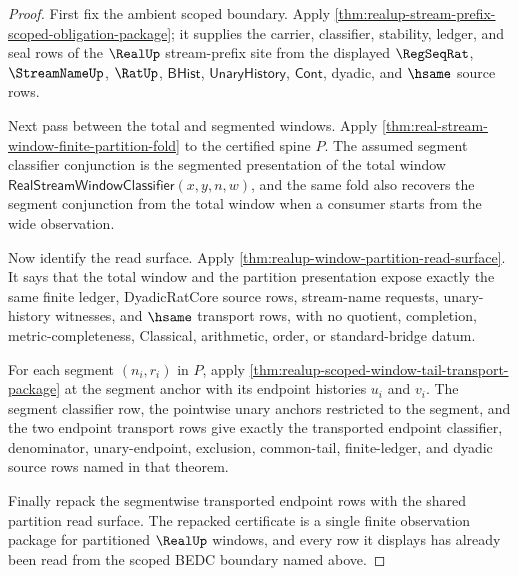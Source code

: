 \begin{proof}
First fix the ambient scoped boundary. Apply
\autoref{thm:realup-stream-prefix-scoped-obligation-package}; it supplies the
carrier, classifier, stability, ledger, and seal rows of the $\RealUp$
stream-prefix site from the displayed $\RegSeqRat$, $\StreamNameUp$, $\RatUp$,
$\mathsf{BHist}$, $\mathsf{UnaryHistory}$, $\mathsf{Cont}$, dyadic, and $\hsame$
source rows.

Next pass between the total and segmented windows. Apply
\autoref{thm:real-stream-window-finite-partition-fold} to the certified spine
$P$. The assumed segment classifier conjunction is the segmented presentation of
the total window $\mathsf{RealStreamWindowClassifier}(x,y,n,w)$, and the same
fold also recovers the segment conjunction from the total window when a consumer
starts from the wide observation.

Now identify the read surface. Apply
\autoref{thm:realup-window-partition-read-surface}. It says that the total
window and the partition presentation expose exactly the same finite ledger,
DyadicRatCore source rows, stream-name requests, unary-history witnesses, and
$\hsame$ transport rows, with no quotient, completion, metric-completeness,
Classical, arithmetic, order, or standard-bridge datum.

For each segment $(n_i,r_i)$ in $P$, apply
\autoref{thm:realup-scoped-window-tail-transport-package} at the segment anchor
with its endpoint histories $u_i$ and $v_i$. The segment classifier row, the
pointwise unary anchors restricted to the segment, and the two endpoint
transport rows give exactly the transported endpoint classifier, denominator,
unary-endpoint, exclusion, common-tail, finite-ledger, and dyadic source rows
named in that theorem.

Finally repack the segmentwise transported endpoint rows with the shared
partition read surface. The repacked certificate is a single finite observation
package for partitioned $\RealUp$ windows, and every row it displays has already
been read from the scoped BEDC boundary named above.
\end{proof}

